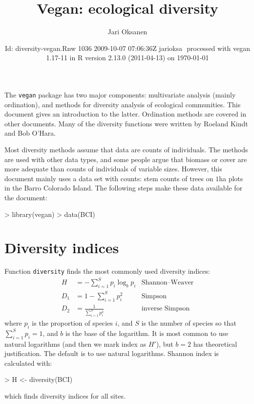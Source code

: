 \documentclass[a4paper,10pt]{amsart}
\title{Vegan: ecological diversity}
\author{Jari Oksanen}
\date{$ $Id: diversity-vegan.Rnw 1036 2009-10-07 07:06:36Z jarioksa $ $
  processed with vegan 1.17-11
  in R version 2.13.0 (2011-04-13) on \today}
\begin{document}

\maketitle

\tableofcontents

\noindent The \texttt{vegan} package has two major components:
multivariate analysis (mainly ordination), and methods for diversity
analysis of ecological communities.  This document gives an
introduction to the latter.  Ordination methods are covered in other
documents.  Many of the diversity functions were written by Roeland
Kindt and Bob O'Hara.

Most diversity methods assume that data are counts of individuals.
The methods are used with other data types, and some people argue that
biomass or cover are more adequate than counts of individuals of
variable sizes.  However, this document mainly uses a data set with
counts: stem counts of trees on $1$ha plots in the Barro Colorado
Island.  The following steps make these data available for the
document:
\begin{Schunk}
\begin{Sinput}
> library(vegan)
> data(BCI)
\end{Sinput}
\end{Schunk}

\section{Diversity indices}

Function \texttt{diversity} finds the most commonly used diversity
indices:
\begin{align}
H &= - \sum_{i=1}^S p_i \log_b  p_i & \text{Shannon--Weaver}\\
D_1 &= 1 - \sum_{i=1}^S p_i^2  &\text{Simpson}\\
D_2 &= \frac{1}{\sum_{i=1}^S p_i^2}  &\text{inverse Simpson}
\end{align}
where $p_i$ is the proportion of species $i$, and $S$ is the number of
species so that $\sum_{i=1}^S p_i = 1$, and $b$ is the base of the
logarithm.  It is most common to use natural logarithms (and then we
mark index as $H'$), but $b=2$ has
theoretical justification. The default is to use natural logarithms.
Shannon index is calculated with:
\begin{Schunk}
\begin{Sinput}
> H <- diversity(BCI)
\end{Sinput}
\end{Schunk}
which finds diversity indices for all sites.
\end{document}
